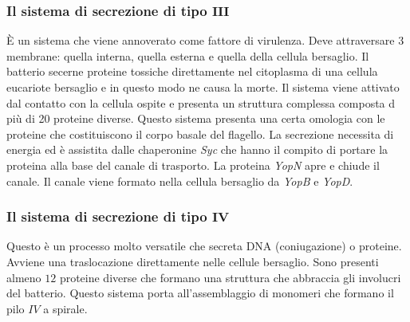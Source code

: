 			\subsubsection{Il sistema di secrezione di tipo $\mathbf{III}$}
			\`E un sistema che viene annoverato come fattore di virulenza.
			Deve attraversare 3 membrane: quella interna, quella esterna e quella della cellula bersaglio.
			Il batterio secerne proteine tossiche direttamente nel citoplasma di una cellula eucariote bersaglio e in questo modo ne causa la morte. 
			Il sistema viene attivato dal contatto con la cellula ospite e presenta un struttura complessa composta d pi\`u di 20 proteine diverse. 
			Questo sistema presenta una certa omologia con le proteine che costituiscono il corpo basale del flagello. 
			La secrezione necessita di energia ed \`e assistita dalle chaperonine \emph{Syc} che hanno il compito di portare la proteina alla base del canale di trasporto. 
			La proteina \emph{YopN} apre e chiude il canale.
			Il canale viene formato nella cellula bersaglio da \emph{YopB} e \emph{YopD}.

			\subsubsection{Il sistema di secrezione di tipo $\mathbf{IV}$}
			Questo \`e un processo molto versatile che secreta DNA (coniugazione) o proteine. 
			Avviene una traslocazione direttamente nelle cellule bersaglio. 
			Sono presenti almeno $12$ proteine diverse che formano una struttura che abbraccia gli involucri del batterio. 
			Questo sistema porta all'assemblaggio di monomeri che formano il pilo $IV$ a spirale. 

